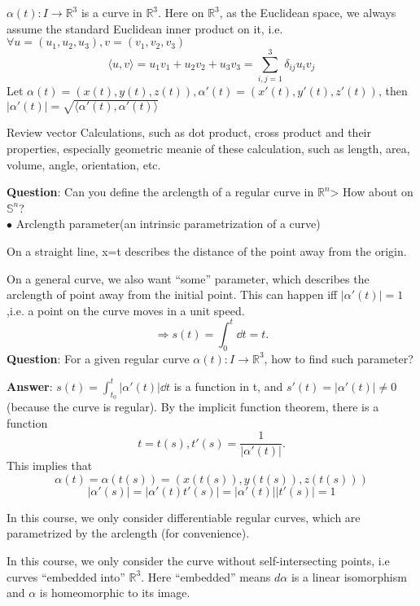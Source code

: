  
$\alpha(t)\colon I\to \mathbb{R}^3$ is a curve in $\mathbb{R}^3$. Here on $\mathbb{R}^3$, as the Euclidean space, we always assume the standard Euclidean inner product on it, i.e. $\forall u=(u_1,u_2,u_3),v=(v_1,v_2,v_3)$
\[\langle u,v\rangle=u_1 v_1+u_2 v_2+ u_3 v_3=\sum_{i,j=1}^3\delta_{ij}u_i v_j\]
Let $\alpha(t)=(x(t),y(t),z(t)),\alpha'(t)=(x'(t),y'(t),z'(t))$, then $\left|\alpha'(t)\right|=\sqrt{\langle\alpha'(t),\alpha'(t)\rangle}$
\begin{exercise}
    Review vector Calculations, such as dot product, cross product and their properties, especially geometric meanie of these calculation, such as length, area, volume, angle, orientation, etc.
\end{exercise}
\noindent
\textbf{Question}: Can you define the arclength of a regular curve in $\mathbb{R}^n$> How about on $\mathbb{S}^n$? \\
$\bullet$ Arclength parameter(an intrinsic parametrization of a curve)
\begin{example}
On a straight line, x=t describes the distance of the point away from the origin.
\begin{center}
\end{center}
\end{example}
On a general curve, we also want ``some'' parameter, which describes the arclength of point away from the initial point. This can happen iff $|\alpha'(t)|=1$,i.e. a point on the curve moves in a unit speed.
\[\Rightarrow s(t)=\int_0^t \dd t=t.\]
\textbf{Question}: For a given regular curve $\alpha(t)\colon I\to \mathbb{R}^3$, how to find such parameter?

\noindent 
\textbf{Answer}: $s(t)=\int_{t_0}^t \left|\alpha'(t)\right|\dd t$ is a function in t, and $s'(t)=\left|\alpha'(t)\right|\neq 0$(because the curve is regular). By the implicit function theorem, there is a function 
\[
    t=t(s),t'(s)=\frac{1}{\left|\alpha'(t)\right|}.
\]
This implies that 
\[
    \alpha(t)=\alpha(t(s))=(x(t(s)),y(t(s)),z(t(s)))
\]
\[
    \left|\alpha'(s)\right|=\left|\alpha'(t)t'(s)\right|=\left|\alpha'(t)\right|\left|t'(s)\right|=1
\]

 In this course, we only consider differentiable regular curves, which are parametrized by the arclength (for convenience).
\begin{remark}
    In this course, we only consider the curve without self-intersecting points, i.e curves ``embedded into'' $\mathbb{R}^3$. Here ``embedded'' means $d\alpha$ is a linear isomorphism and $\alpha$ is homeomorphic to its image.
\end{remark}

